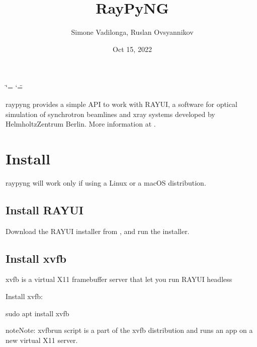 \documentclass[letterpaper,10pt,english]{sphinxmanual}
\title{RayPyNG}
\date{Oct 15, 2022}
\author{Simone Vadilonga, Ruslan Ovsyannikov}
\begin{document}
\ifdefined\shorthandoff
  \ifnum\catcode`\=\string=\active\shorthandoff{=}\fi
  \ifnum\catcode`\"=\active{}\fi
\fi

\pagestyle{empty}
\sphinxmaketitle
\pagestyle{plain}
\sphinxtableofcontents
\pagestyle{normal}
\label{\detokenize{index::doc}}


\sphinxAtStartPar
raypyng provides a simple API to work with RAY\sphinxhyphen{}UI,
a software for optical simulation of synchrotron
beamlines and x\sphinxhyphen{}ray systems developed by
Helmholtz\sphinxhyphen{}Zentrum Berlin.
More information at .

\sphinxstepscope


\chapter{Install}
\label{\detokenize{install_raypyng:install}}\label{\detokenize{install_raypyng::doc}}
\sphinxAtStartPar
raypyng will work only if using a Linux or a macOS distribution.


\section{Install RAY\sphinxhyphen{}UI}
\label{\detokenize{install_raypyng:install-ray-ui}}
\sphinxAtStartPar
Download the RAY\sphinxhyphen{}UI installer from  ,
and run the installer.


\section{Install xvfb}
\label{\detokenize{install_raypyng:install-xvfb}}
\sphinxAtStartPar
xvfb is a virtual X11 framebuffer server that let you run RAY\sphinxhyphen{}UI headless

\sphinxAtStartPar
Install xvfb:

\begin{sphinxVerbatim}[commandchars=\\\{\}]
sudo apt install xvfb
\end{sphinxVerbatim}

\begin{sphinxadmonition}{note}{Note:}
\sphinxAtStartPar
xvfb\sphinxhyphen{}run script is a part of the xvfb distribution and
runs an app on a new virtual X11 server.
\end{sphinxadmonition}
\end{document}

